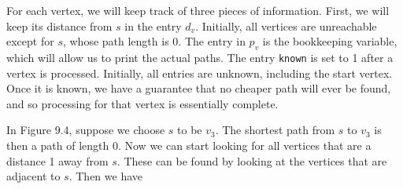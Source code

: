 For each vertex, we will keep track of three pieces of information. First, we will keep its distance from \(s\) in the entry \(d_v\). Initially, all vertices are unreachable except for \(s\), whose path length is 0. The entry in \(p_v\) is the bookkeeping variable, which will allow us to print the actual paths. The entry \texttt{known} is set to 1 after a vertex is processed. Initially, all entries are unknown, including the start vertex. Once it is known, we have a guarantee that no cheaper path will ever be found, and so processing for that vertex is essentially complete.

In Figure 9.4, suppose we choose \(s\) to be \(v_3\). The shortest path from \(s\) to \(v_3\) is then a path of length 0. Now we can start looking for all vertices that are a distance 1 away from \(s\). These can be found by looking at the vertices that are adjacent to \(s\). Then we have

